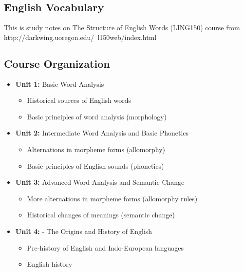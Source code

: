 \documentclass[12pt]{article}
\begin{document}
\maketitle
\pagebreak

\pagebreak
\vspace*{\fill}
\begin{center}
\section{English Vocabulary}
\end{center}
\vspace*{\fill}
\pagebreak

This is study notes on The Structure of English Words (LING150) course from http://darkwing.uoregon.edu/~l150web/index.html
\subsection{Course Organization}
\begin{itemize}
\item \textbf{Unit 1:} Basic Word Analysis
\begin{itemize}
\item Historical sources of English words
\item Basic principles of word analysis (morphology)
\end{itemize}
\item \textbf{Unit 2:} Intermediate Word Analysis and Basic Phonetics
\begin{itemize}
\item Alternations in morpheme forms (allomorphy)
\item Basic principles of English sounds (phonetics)
\end{itemize}
\item \textbf{Unit 3:} Advanced Word Analysis and Semantic Change
\begin{itemize}
\item More alternations in morpheme forms (allomorphy rules)
\item Historical changes of meanings (semantic change)
\end{itemize}
\item \textbf{Unit 4:} - The Origins and History of English
\begin{itemize}
\item Pre-history of English and Indo-European languages
\item English history
\end{itemize}
\end{itemize}
\end{document}

